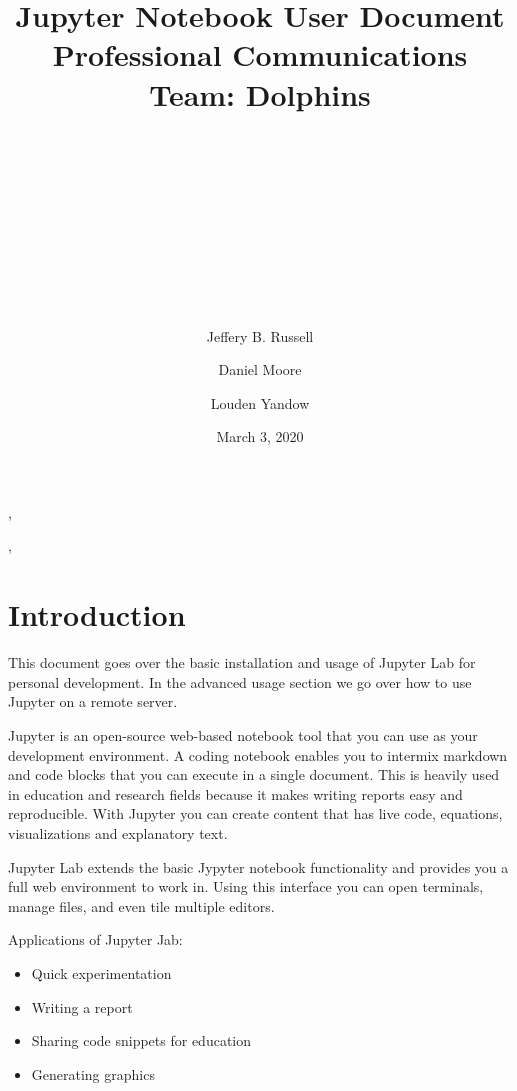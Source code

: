 \documentclass[pdftex,12pt]{artikel3}
\title{
\begin{center}
\huge{Jupyter Notebook User Document} \\
\huge{Professional Communications}\\
\newline
\huge{Team: Dolphins}\\
\end{center}
\\
\\
\\
\\
\author{} %
\date{}   %
}
\begin{document}
\maketitle


\begin{center}

\author{Jeffery B. Russell},
\author{Daniel Moore},
\author{Louden Yandow}

\date{March 3, 2020}
\end{center}

\newpage

\tableofcontents
{}
\newpage
\listoffigures
{}

\newpage

\section{Introduction}

This document goes over the basic installation and usage of Jupyter Lab for personal development. 
In the advanced usage section we go over how to use Jupyter on a remote server. 

Jupyter  is an open-source web-based notebook tool that you can use as your development environment.
A coding notebook enables you to intermix markdown and code blocks that you can execute in a single document. This is heavily used in education and research fields because it makes writing reports easy and reproducible. With Jupyter you can create content that has live code, equations, visualizations and explanatory text.

Jupyter Lab extends the basic Jypyter notebook functionality and provides you a full web environment to work in. Using this interface you can open terminals, manage files, and even tile multiple editors.

Applications of Jupyter Jab:

\begin{itemize}
  \item Quick experimentation
  \item Writing a report
  \item Sharing code snippets for education
  \item Generating graphics
\end{itemize}
\end{document}
